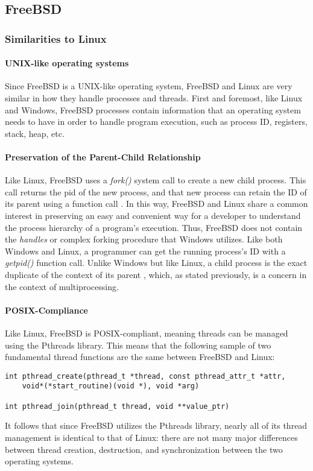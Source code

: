 \documentclass[letterpaper,10pt,titlepage]{article}
\begin{document}
\subsection{FreeBSD}
% 
%
%

\subsubsection{Similarities to Linux}
\paragraph{UNIX-like operating systems}
Since FreeBSD is a UNIX-like operating system, FreeBSD and Linux are very similar in how they handle processes and threads. First and foremost, like Linux and Windows, FreeBSD processes contain information that an operating system needs to have in order to handle program execution, such as process ID, registers, stack, heap, etc. 
\paragraph{Preservation of the Parent-Child Relationship} 
Like Linux, FreeBSD uses a \emph{fork()} system call to create a new child process. This call returns the pid of the new process, and that new process can retain the ID of its parent using a function call \cite{freeBSD1}. In this way, FreeBSD and Linux share a common interest in preserving an easy and convenient way for a developer to understand the process hierarchy of a program's execution. Thus, FreeBSD does not contain the \emph{handles} or complex forking procedure that Windows utilizes. Like both Windows and Linux, a programmer can get the running process's ID with a \emph{getpid()} function call. Unlike Windows but like Linux, a child process is the exact duplicate of the context of its parent \cite{linux1}, which, as stated previously, is a concern in the context of multiprocessing.
\paragraph{POSIX-Compliance}
Like Linux, FreeBSD is POSIX-compliant, meaning threads can be managed using the Pthreads library. This means that the following sample of two fundamental thread functions are the same between FreeBSD and Linux:
\begin{lstlisting}
int pthread_create(pthread_t *thread, const pthread_attr_t *attr, 
	void*(*start_routine)(void *), void *arg)

int pthread_join(pthread_t thread, void **value_ptr)
\end{lstlisting}
It follows that since FreeBSD utilizes the Pthreads library, nearly all of its thread management is identical to that of Linux: there are not many major differences between thread creation, destruction, and synchronization between the two operating systems.
\end{document}
